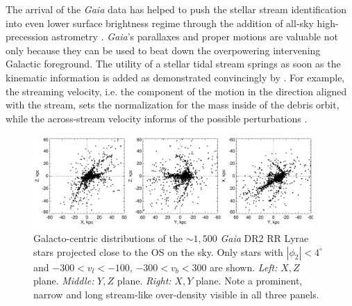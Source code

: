 \documentclass[a4paper,useAMS,usenatbib]{mnras}
\newcommand{\Gaia}{{\it Gaia}}
\newcommand{\gaia}{\textit{Gaia} }
\begin{document}
The arrival of the \gaia data \citep[see][]{Prusti2016, Brown2018} has
helped to push the stellar stream identification into even lower
surface brightness regime through the addition of all-sky
high-precession astrometry
\citep[see][]{Myeong2018,Ibata2018,Koppelman2018,Malhan2018,Adrian2018,CloudsArms}.
\Gaia's parallaxes and proper motions are valuable not only because
they can be used to beat down the overpowering intervening Galactic
foreground. The utility of a stellar tidal stream springs as soon as
the kinematic information is added as demonstrated convincingly by
\citet{Koposov2010}. For example, the streaming velocity, i.e. the
component of the motion in the direction aligned with the stream, sets
the normalization for the mass inside of the debris orbit, while the
across-stream velocity informs of the possible perturbations
\citep[see e.g.][]{Erkal2018}.

%
\begin{figure}
  \centering
  \includegraphics[width=0.95\textwidth]{orphan_paper_xyz.pdf}
  \caption[]{Galacto-centric distributions of the $\sim1,500$ \gaia
    DR2 RR Lyrae stars projected close to the OS on the sky. Only
    stars with $|\phi_2|<4^{\circ}$ and $-300<v_l <-100$, $-300<v_b
    <300$ are shown. {\it Left:} $X,Z$ plane. {\it Middle:} $Y,Z$
    plane. {\it Right:} $X,Y$ plane. Note a prominent, narrow and long
    stream-like over-density visible in all three panels.}
   \label{fig:xyzgdr2}
\end{figure}
%
\end{document}
